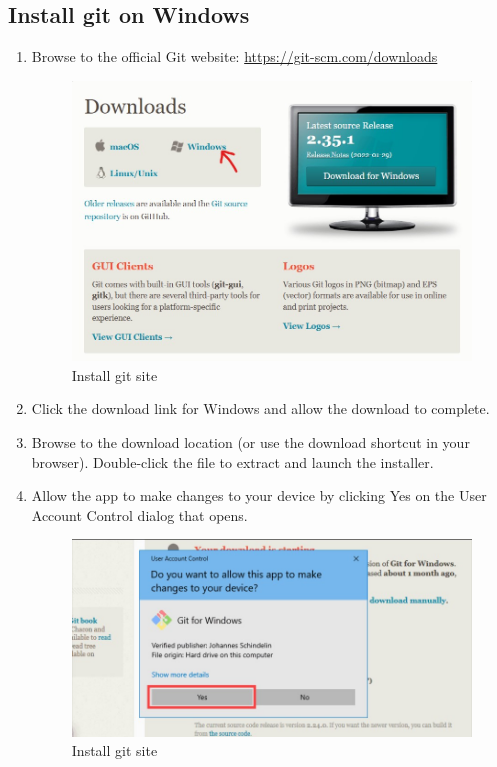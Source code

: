 \documentclass[12pt]{article}
\begin{document}
\subsection{Install git on Windows}
\begin{enumerate}
\item Browse to the official Git website: \href{https://git-scm.com/downloads}{https://git-scm.com/downloads}
\begin{figure}[H]
\centering
\includegraphics[scale=0.7]{gitinstallsite}
\caption{Install git site}
\label{gitversion}
\vspace{0.6\baselineskip}
\end{figure}

\item  Click the download link for Windows and allow the download to complete.

\item  Browse to the download location (or use the download shortcut in your browser). Double-click the file to extract and launch the installer.

\item Allow the app to make changes to your device by clicking Yes on the User Account Control dialog that opens.


\begin{figure}[H]
\centering
\includegraphics[scale=0.7]{gitinstall4}
\caption{Install git site}
\label{gitversion}
\vspace{0.6\baselineskip}
\end{figure}


\end{enumerate}
\end{document}

